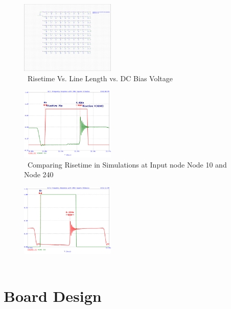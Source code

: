 \documentclass[journal]{IEEEtran}
\begin{document}
\begin{figure}[htb]
\centering
\includegraphics[width=0.4\textwidth,page = {3}]{RiseTimeVsDCBIASVsLength.pdf}
\caption{\ Risetime Vs. Line Length vs. DC Bias Voltage 
}\label{fig:RiseVsLineVsBias}
\end{figure}


\begin{figure}[htb]
\centering
\includegraphics[width=0.4\textwidth,page={1}]{Probed_Input_N10_N240_NoSeriesResistance.pdf}
\caption{\ Comparing Risetime in Simulations at Input node Node 10 and Node 240
}\label{fig:ProbedTransientNoSer}
\end{figure}

\begin{figure}[htb]
\centering
\includegraphics[width=0.4\textwidth,page={1}]{Probed_Input_N10_N240_With_SeriesResistance.pdf}
\caption{\
}\label{fig:ProbedTransientYesSer}
\end{figure}





\section{Board Design} 
\end{document}

